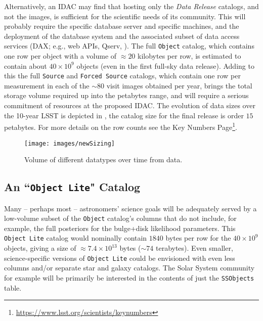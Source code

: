 Alternatively, an \gls{IDAC} may find that hosting only the {\it Data Release} catalogs, and not the images, is sufficient for the scientific needs of its community. This will probably require the specific \RO database server  and specific machines, and the deployment of the database system and the associated subset of data access services (\gls{DAX}; e.g., web APIs, \gls{Qserv}, ). The full {\tt Object} catalog, which contains one row per object with a volume of $\approx 20$ kilobytes per row, is estimated to contain about $40 \times 10^9$ objects (even in the first full-sky data release). Adding to this the full {\tt Source} and {\tt Forced Source} catalogs, which contain one row per measurement in each of the $\sim80$ visit images obtained per year, brings the total storage volume required up into the petabytes range, and will require a serious commitment of resources at the proposed \gls{IDAC}. The evolution of data sizes over the 10-year \gls{LSST} is depicted in , the catalog size for the final release is order $15$ petabytes. For more details on the row counts see the Key Numbers Page\footnote{\url{https://www.lsst.org/scientists/keynumbers}}.

\begin{figure}
\begin{center}
\texttt{[image: images/newSizing]}
\caption{ Volume of different datatypes  over time from  data. \label{fig:catvol}}
\end{center}
\end{figure}

\subsection{An ``{\tt \gls{Object} Lite}" Catalog}\label{sec:lite}

Many -- perhaps most -- astronomers' science goals will be adequately served by a low-volume subset of the {\tt \gls{Object}} catalog's columns that do not include, for example, the full posteriors for the bulge+disk likelihood parameters.
This {\tt \gls{Object} Lite} catalog would nominally contain $1840$ bytes per row for the $40 \times 10^{9}$ objects, giving a size of $\approx 7.4 \times 10^{13}$ bytes ($\sim74$ terabytes).
Even smaller, science-specific versions of {\tt \gls{Object} Lite} could be envisioned with even less columns and/or separate star and galaxy catalogs.
The Solar System community for example will be primarily be interested in the contents of  just the  {\tt SSObjects} table.

